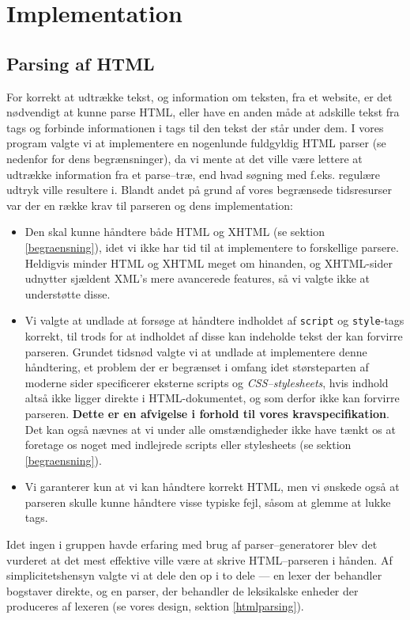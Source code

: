 \documentclass[a4paper,oneside,article]{memoir}
\begin{document}
\newpage
\chapter{Implementation}

\section{Parsing af HTML}
\label{htmlparserimpl}
For korrekt at udtrække tekst, og information om teksten, fra et
website, er det nødvendigt at kunne parse HTML, eller have en anden
måde at adskille tekst fra tags og forbinde informationen i tags til
den tekst der står under dem. I vores program valgte vi at
implementere en nogenlunde fuldgyldig HTML parser (se nedenfor for
dens begrænsninger), da vi mente at det ville være lettere at udtrække
information fra et parse--træ, end hvad søgning med f.eks. regulære
udtryk ville resultere i. Blandt andet på grund af vores begrænsede
tidsresurser var der en række krav til parseren og dens
implementation:

\begin{itemize}
\item Den skal kunne håndtere både HTML og XHTML (se sektion
  \ref{begraensning}), idet vi ikke har tid til at implementere to
  forskellige parsere. Heldigvis minder HTML og XHTML meget om
  hinanden, og XHTML-sider udnytter sjældent XML's mere avancerede
  features, så vi valgte ikke at understøtte disse.
\item Vi valgte at undlade at forsøge at håndtere indholdet af
  \texttt{script} og \texttt{style}-tags korrekt, til trods for at
  indholdet af disse kan indeholde tekst der kan forvirre
  parseren. Grundet tidsnød valgte vi at undlade at implementere denne
  håndtering, et problem der er begrænset i omfang idet størsteparten
  af moderne sider specificerer eksterne scripts og
  \textit{CSS--stylesheets}, hvis indhold altså ikke ligger direkte i
  HTML-dokumentet, og som derfor ikke kan forvirre
  parseren. \textbf{Dette er en afvigelse i forhold til vores
    kravspecifikation}. Det kan også nævnes at vi under alle
  omstændigheder ikke have tænkt os at foretage os noget med
  indlejrede scripts eller stylesheets (se sektion
  \ref{begraensning}).
\item Vi garanterer kun at vi kan håndtere korrekt HTML, men vi
  ønskede også at parseren skulle kunne håndtere visse typiske fejl,
  såsom at glemme at lukke tags.
\end{itemize}

Idet ingen i gruppen havde erfaring med brug af parser--generatorer
blev det vurderet at det mest effektive ville være at skrive
HTML--parseren i hånden. Af simplicitetshensyn valgte vi at dele den
op i to dele --- en lexer der behandler bogstaver direkte, og en
parser, der behandler de leksikalske enheder der produceres af lexeren
(se vores design, sektion \ref{htmlparsing}).
\end{document}
